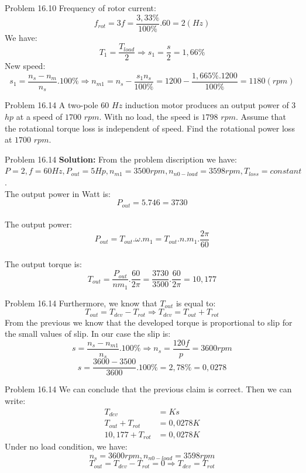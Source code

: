 \documentclass[11pt,aspectratio=169]{beamer}
\begin{document}
\begin{frame}{Problem 16.10}
      Frequency of rotor current:
      $$f_{rot}=3f=\frac{3,33\%}{100\%}.60=2(Hz)$$
      We have:
      $$T_{1}=\frac{T_{load}}{2}\Rightarrow s_{1}=\frac{s}{2}=1,66\%$$
      New speed:
      $$s_{1}=\frac{n_{s}-n_{m}}{n_{s}}.100\%\Rightarrow n_{m1}=n_{s}-\frac{s_{1}n_{s}}{100\%}=1200-\frac{1,665\%.1200}{100\%}=1180 (rpm)$$ 
    
\end{frame}
\begin{frame}{Problem 16.14}
    A two-pole $60$ $Hz$ induction motor produces an output power
of $3$ $hp$ at a speed of $1700$ $rpm$. With no load, the speed is $1798$ $rpm$. Assume that the
rotational torque loss is independent of speed. Find the rotational power loss at $1700$ $rpm$.
\end{frame}
\begin{frame}{Problem 16.14}
   \textbf{Solution:} From the problem discription we have:
$P=2, f=60Hz, P_{out}=5Hp, n_{m1}=3500rpm, n_{n0-load}=3598 rpm, T_{loss}= constant$.
\\The output power in Watt is:
$$P_{out}=5.746=3730$$
\\The output power:
$$P_{out}=T_{out}.\omega.m_{1}=T_{out}.n.m_{1}.\frac{2\pi}{60}$$
\\The output torque is:
$$T_{out}=\frac{P_{out}}{nm_{1}}.\frac{60}{2\pi}=\frac{3730}{3500}.\frac{60}{2\pi}=10,177$$
\end{frame}
\begin{frame}{Problem 16.14}
    Furthermore, we know that $T_{out}$ is equal to:
$$T_{out}=T_{dev}-T_{rot}\Rightarrow T_{dev}=T_{out}+T_{rot}$$
From the previous we know that the developed torque is proportional to slip for
the small values of slip. In our case the slip is:
\begin{equation*}
s=\frac{n_{s}-n_{m1}}{n_{s}}.100\% \Rightarrow n_{s}=\frac{120f}{p}=3600 rpm
\end{equation*}
\begin{equation*}
s=\frac{3600-3500}{3600}.100\%=2,78\%=0,0278
\end{equation*}
\end{frame}
\begin{frame}{Problem 16.14}
    We can conclude that the previous claim is correct. Then we can write:
\begin{align*}
T_{dev}&=Ks\\
T_{out}+T_{rot}&=0,0278K\\
10,177+T_{rot}&=0,0278K
\end{align*}
Under no load condition, we have:
$$n_{s}=3600 rpm, n_{n0-load}=3598 rpm$$
$$T_{out}=T_{dev}-T_{rot}=0\Rightarrow T_{dev}=T_{rot}$$
\end{frame}
\end{document}
